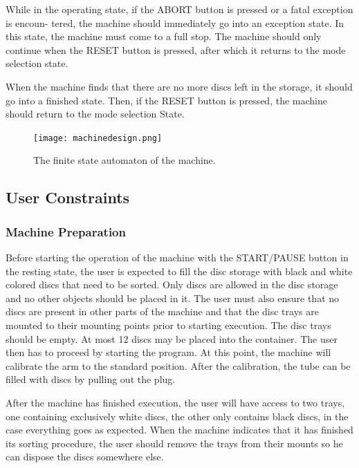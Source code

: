 \documentclass[a4paper,oneside,11pt]{article}
\begin{document}
While in the operating state, if the ABORT button is pressed or a fatal exception is encoun-
tered, the machine should immediately go into an exception state. In this state, the machine
must come to a full stop. The machine should only continue when the RESET button is pressed,
after which it returns to the mode selection state.

When the machine finds that there are no more discs left in the storage, it should go into a
finished state. Then, if the RESET button is pressed, the machine should return to the mode selection
State.

\begin{figure}[H]
	\centering
	\texttt{[image: machinedesign.png]}
	\caption{\label{machinedesign}The finite state automaton of the machine.}
\end{figure}

\subsection{User Constraints}
\subsubsection{Machine Preparation}
Before starting the operation of the machine with the START/PAUSE button in the resting state, the user is expected to fill the disc storage with black and
white colored discs that need to be sorted. Only discs are allowed in the disc storage and no
other objects should be placed in it. The user must also ensure that no discs are present in
other parts of the machine and that the disc trays are mounted to their mounting points prior
to starting execution. The disc trays should be empty. At most 12 discs may be placed into the
container. The user then has to proceed by starting the program. At this point, the machine will calibrate the arm to the standard position. After the calibration, the tube can be filled with
discs by pulling out the plug.

After the machine has finished execution, the user will have access to two trays, one containing exclusively white discs, the other only contains black discs, in the case everything goes as expected. When the machine indicates
that it has finished its sorting procedure, the user should remove the trays from their mounts
so he can dispose the discs somewhere else.
\end{document}
